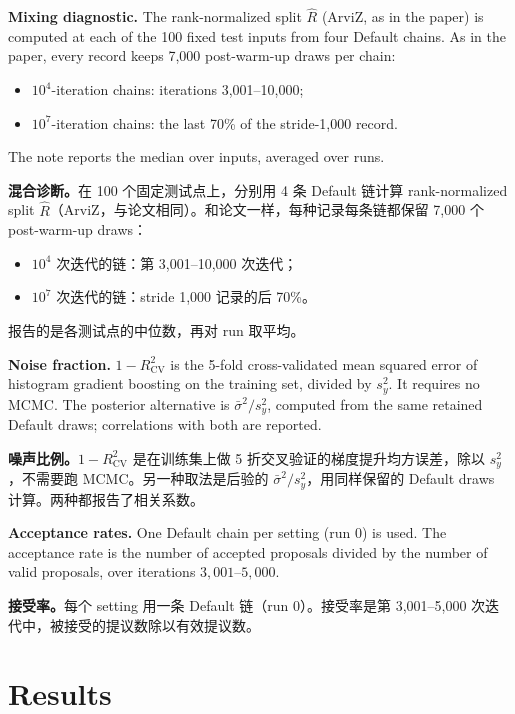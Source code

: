 \documentclass[11pt]{article}
\newcommand{\zhfont}{}
\newcommand{\Rhat}{\hat R}
\begin{document}
\textbf{Mixing diagnostic.} The rank-normalized split $\Rhat$ (ArviZ, as in the paper) is computed at each of the 100 fixed test inputs from four Default chains. As in the paper, every record keeps 7,000 post-warm-up draws per chain:
\begin{itemize}
\item $10^4$-iteration chains: iterations 3,001--10,000;
\item $10^7$-iteration chains: the last 70\% of the stride-1,000 record.
\end{itemize}
The note reports the median over inputs, averaged over runs.

\begin{zhbox}
\textbf{混合诊断。}在 100 个固定测试点上，分别用 4 条 Default 链计算 rank-normalized split $\Rhat$（ArviZ，与论文相同）。和论文一样，每种记录每条链都保留 7,000 个 post-warm-up draws：
\begin{itemize}
\item $10^4$ 次迭代的链：第 3,001--10,000 次迭代；
\item $10^7$ 次迭代的链：stride 1,000 记录的后 70\%。
\end{itemize}
报告的是各测试点的中位数，再对 run 取平均。
\end{zhbox}


\textbf{Noise fraction.} $1-R^2_{\mathrm{CV}}$ is the 5-fold cross-validated mean squared error of histogram gradient boosting on the training set, divided by $s_y^2$. It requires no MCMC. The posterior alternative is $\bar\sigma^2/s_y^2$, computed from the same retained Default draws; correlations with both are reported.

\begin{zhbox}
\textbf{噪声比例。}$1-R^2_{\mathrm{CV}}$ 是在训练集上做 5 折交叉验证的梯度提升均方误差，除以 $s_y^2$，不需要跑 MCMC。另一种取法是后验的 $\bar\sigma^2/s_y^2$，用同样保留的 Default draws 计算。两种都报告了相关系数。
\end{zhbox}


\textbf{Acceptance rates.} One Default chain per setting (run 0) is used. The acceptance rate is the number of accepted proposals divided by the number of valid proposals, over iterations $3{,}001$--$5{,}000$.

\begin{zhbox}
\textbf{接受率。}每个 setting 用一条 Default 链（run 0）。接受率是第 3,001--5,000 次迭代中，被接受的提议数除以有效提议数。
\end{zhbox}


\section{Results\quad{\zhfont 结果}}
\end{document}

